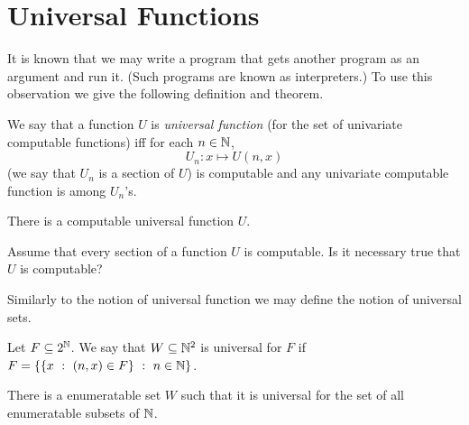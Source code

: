 \chapter{Universal Functions}
It is known that we may write a program that gets another program as an argument
and run it. (Such programs are known as interpreters.) To use this observation
we give the following definition and theorem.
\begin{definition}
  We say that a function $U$ is \emph{universal function} (for the set of univariate
  computable functions) iff for each $n \in {\mathbb{N}}$,
  \[
    U_n : x \mapsto U(n, x)
  \]
  (we say that $U_n$ is a section of $U$)
  is computable and any univariate computable function is among $U_n$'s.
\end{definition}

\begin{theorem}
\label{theorem:universal-function-computable}
  There is a computable universal function $U$.
\end{theorem}

\begin{exercise}
  Assume that every section of a function $U$ is computable.
  Is it necessary true that $U$ is computable?
\end{exercise}

Similarly to the notion of universal function we may define the notion
of universal sets.
\begin{definition}
  Let $F \subseteq 2^{\mathbb{N}}$. We say that $W \subseteq {\mathbb{N}}^2$ is universal for $F$
  if $F = \set[n \in \N]{\set[(n, x) \in F]{x}}$.
\end{definition}

\begin{theorem}
  There is a enumeratable set $W$ such that it is universal for the set of
  all enumeratable subsets of ${\mathbb{N}}$.
\end{theorem}
%
%
